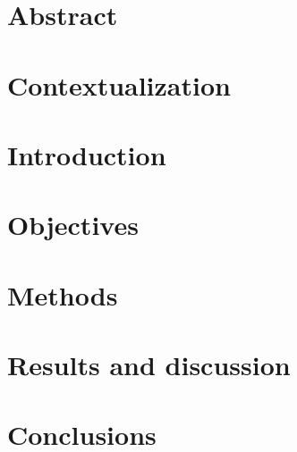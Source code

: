 \documentclass{article}
\begin{document}

\vspace{10cm}
\tableofcontents

\newpage
\section*{Abstract}


\section*{Contextualization}


\section{Introduction}


\section{Objectives}


\section{Methods}


\section{Results and discussion}


\section{Conclusions}


\printbibliography


\end{document}
